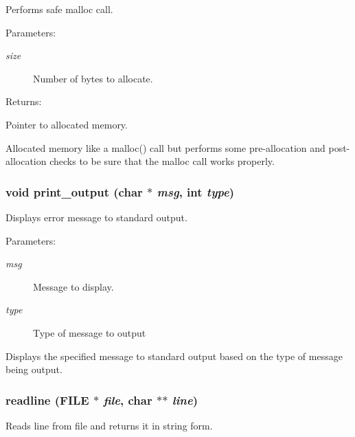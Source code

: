 Performs safe malloc call.

\begin{Desc}
\item[Parameters: ]\par
\begin{description}
\item[{\em 
size}]Number of bytes to allocate.\end{description}
\end{Desc}
\begin{Desc}
\item[Returns: ]\par
Pointer to allocated memory.\end{Desc}
Allocated memory like a malloc() call but performs some pre-allocation and post-allocation checks to be sure that the malloc call works properly. 
\subsubsection{\setlength{\rightskip}{0pt plus 5cm}void print\_\-output (char $\ast$ {\em msg}, int {\em type})}\label{util_8c_a6}


Displays error message to standard output.

\begin{Desc}
\item[Parameters: ]\par
\begin{description}
\item[{\em 
msg}]Message to display. \item[{\em 
type}]Type of message to output\end{description}
\end{Desc}
Displays the specified message to standard output based on the type of message being output. 
\subsubsection{ readline (FILE $\ast$ {\em file}, char $\ast$$\ast$ {\em line})}\label{util_8c_a12}


Reads line from file and returns it in string form.

